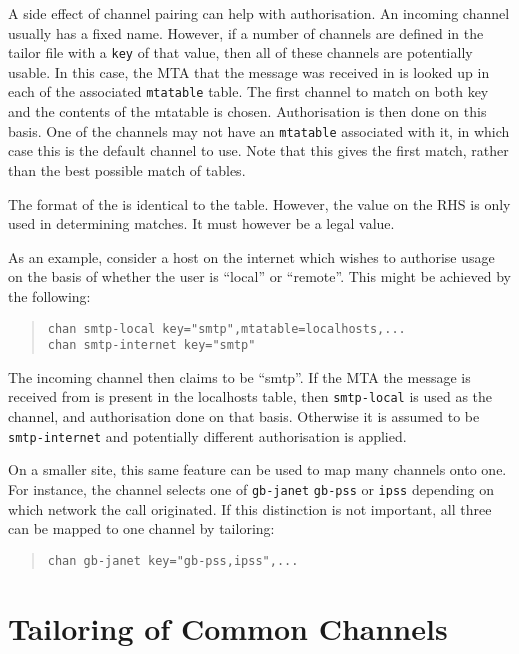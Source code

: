 A side effect of channel pairing can help with authorisation. An
incoming channel usually has a fixed name. However, if a number of
channels are defined in the tailor file with a \verb|key| of that
value, then all of these channels are potentially usable. In this
case, the MTA that the message was received in is looked up in each of
the associated \verb|mtatable| table. The first channel to match on
both key and the contents of the mtatable is chosen.  Authorisation is
then done on this basis. One of the channels may not have an
\verb|mtatable| associated with it, in which case this is the default
channel to use. Note that this gives the first match, rather than the
best possible match of tables.

The format of the  is identical to the 
table.  However, the value on the RHS is only used in determining
matches. It must however be a legal value.

As an example, consider a host on the internet which wishes to
authorise usage on the basis of whether the user is ``local'' or
``remote''. This might be achieved by the following:
\begin{quote}\small\begin{verbatim}
chan smtp-local key="smtp",mtatable=localhosts,...
chan smtp-internet key="smtp"
\end{verbatim}\end{quote}

The incoming channel then claims to be ``smtp''. If the MTA the
message is received from is present in the localhosts table, then
\verb|smtp-local| is used as the channel, and authorisation done on
that basis. Otherwise it is assumed to be \verb|smtp-internet| and
potentially different authorisation is applied.

On a smaller site, this same feature can be used to map many channels
onto one. For instance, the  channel selects one of
\verb|gb-janet| \verb|gb-pss| or \verb|ipss| depending on which
network the call originated. If this distinction is not important, all
three can be mapped to one channel by tailoring:
\begin{quote}\small\begin{verbatim}
chan gb-janet key="gb-pss,ipss",...
\end{verbatim}\end{quote}

\section {Tailoring of Common Channels}

